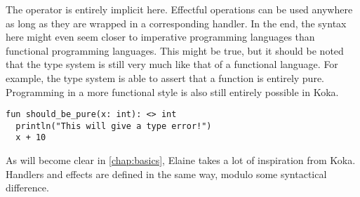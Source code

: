 The \hs{>>=} operator is entirely implicit here. Effectful operations can be used anywhere as long as they are wrapped in a corresponding handler. In the end, the syntax here might even seem closer to imperative programming languages than functional programming languages. This might be true, but it should be noted that the type system is still very much like that of a functional language. For example, the type system is able to assert that a function is entirely pure. Programming in a more functional style is also still entirely possible in Koka.

\begin{lstlisting}[language=koka,style=fancy]
fun should_be_pure(x: int): <> int
  println("This will give a type error!")
  x + 10
\end{lstlisting}

As will become clear in \cref{chap:basics}, Elaine takes a lot of inspiration from Koka. Handlers and effects are defined in the same way, modulo some syntactical difference.
